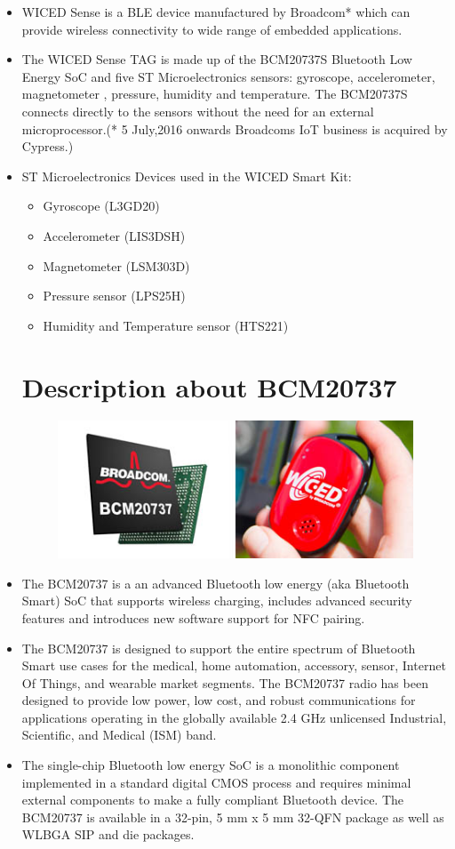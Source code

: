 \documentclass[11pt,a4paper]{article}
\begin{document}
\begin{itemize}
\item WICED Sense is a BLE device manufactured by Broadcom* which can provide wireless connectivity to wide range of embedded applications.
\item The WICED Sense TAG is made up of the BCM20737S Bluetooth Low Energy SoC and five ST Microelectronics sensors: gyroscope, accelerometer, magnetometer , pressure, humidity and temperature. The BCM20737S connects directly to the sensors without the need for an external microprocessor.(* 5 July,2016 onwards Broadcoms IoT business is acquired by Cypress.)
\item ST Microelectronics Devices used in the WICED Smart Kit:
\begin{itemize}
\item Gyroscope (L3GD20)
\item Accelerometer (LIS3DSH)
\item Magnetometer (LSM303D)
\item Pressure sensor (LPS25H)
\item Humidity and Temperature sensor (HTS221)
\end{itemize}


\newpage
\section{Description about BCM20737}

\begin{figure}[h]
    \centering
	\includegraphics[scale=0.5]{BCM20737.jpg}
	\end{figure}



\item The BCM20737 is a an advanced Bluetooth low energy (aka Bluetooth Smart) 
SoC that supports wireless charging, includes advanced security features and introduces new software support for NFC pairing. 
\item The BCM20737 is designed to support the entire spectrum of Bluetooth Smart use cases for the medical, home automation, accessory, sensor, Internet Of Things, and wearable market
segments. The BCM20737 radio has been designed to provide
low power, low cost, and robust communications for applications operating in the globally available
2.4 GHz unlicensed Industrial, Scientific, and Medical
(ISM) band.
\item The single-chip Bluetooth low energy SoC is a
monolithic component implemented in a standard
digital CMOS process and requires minimal external
components to make a fully compliant Bluetooth
device. The BCM20737 is available in a 32-pin,
5 mm x 5 mm 32-QFN package as well as WLBGA
SIP and die packages.


\end{itemize}
\end{document}
